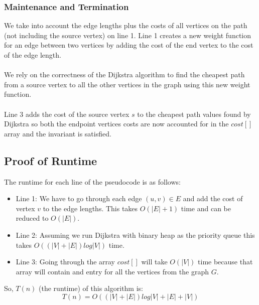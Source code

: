 \documentclass[12pt]{article}
\begin{document}
\subsubsection*{Maintenance and Termination}
We take into account the edge lengths plus the costs of all vertices on the path (not including the source vertex) on line 1.  Line 1 creates a new weight function for an edge between two vertices by adding the cost of the end vertex to the cost of the edge length.\\  
\\
We rely on the correctness of the Dijkstra algorithm to find the cheapest path from a source vertex to all the other vertices in the graph using this new weight function.\\
\\
Line 3 adds the cost of the source vertex $s$ to the cheapest path values found by Dijkstra so both the endpoint vertices costs are now accounted for in the $cost[]$ array and the invariant is satisfied.\\
\subsection*{Proof of Runtime}
The runtime for each line of the pseudocode is as follows:\\
\begin{itemize}
\item Line 1: We have to go through each edge $(u,v) \in E$ and add the cost of vertex $v$ to the edge lengths.  This takes $O(|E| + 1)$ time and can be reduced to $O(|E|)$.
\item Line 2: Assuming we run Dijkstra with binary heap as the priority queue this takes $O((|V|+|E|)log|V|)$ time.
\item Line 3: Going through the array $cost[]$ will take $O(|V|)$ time because that array will contain and entry for all the vertices from the graph $G$.
\end{itemize}
So, $T(n)$ (the runtime) of this algorithm is:\\
$$
T(n) = O((|V|+|E|)log|V| + |E| + |V|)
$$
\end{document}
